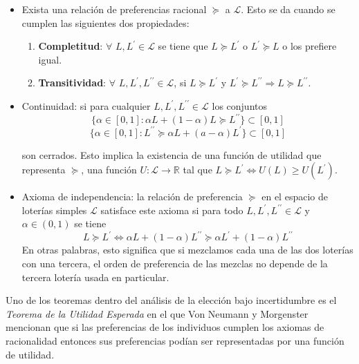 \begin{itemize}
    \item Exista una relación de preferencias racional $\succeq$ a $\mathscr{L}$. Esto se da cuando se cumplen las siguientes dos propiedades:
    \begin{enumerate}
        \item \textbf{Completitud}: $\forall$ $L,L^\prime \in \mathscr{L}$ se tiene que $L \succeq L^\prime$ o $L^\prime \succeq L$ o los prefiere igual.
        
        \item \textbf{Transitividad}: $\forall$ $L,L^\prime, L^{\prime \prime} \in \mathscr{L}$, si $L \succeq L^\prime $ y $L^\prime \succeq L^{\prime \prime} \Rightarrow L \succeq L^{\prime \prime}$.
    \end{enumerate}
    
    \item Continuidad: si para cualquier $L,L^\prime, L^{\prime \prime} \in \mathscr{L}$ los conjuntos
    $$\{ \alpha \in [0,1] : \alpha L + (1-\alpha)L \succeq L^{\prime \prime}\} \subset [0,1]$$
    $$\{ \alpha \in [0,1] : L^{\prime \prime} \succeq \alpha L + (a- \alpha) L^\prime \} \subset [0,1]$$
    
    son cerrados. Esto implica la existencia de una función de utilidad que representa $\succeq$, una función $U: \mathscr{L} \rightarrow \mathbb{R}$ tal que $L \succeq L^\prime \Leftrightarrow U(L) \geq U(L^\prime)$.
    
    \item Axioma de independencia: la relación de preferencia $\succeq$ en el espacio de loterías simples $\mathscr{L}$ satisface este axioma si para todo $L,L^\prime, L^{\prime \prime} \in \mathscr{L}$ y $\alpha \in (0,1)$ se tiene
    $$
    L \succeq L^\prime \Leftrightarrow \alpha L + (1-\alpha)L^{\prime \prime} \succeq \alpha L^{\prime} + (1-\alpha)L^{\prime \prime}
    $$
    En otras palabras, esto significa que si mezclamos cada una de las dos loterías con una tercera, el orden de preferencia de las mezclas no depende de la tercera lotería usada en particular.
\end{itemize}

Uno de los teoremas dentro del análisis de la elección bajo incertidumbre es el \textit{Teorema de la Utilidad Esperada} en el que Von Neumann y Morgenster mencionan que si las preferencias de los individuos cumplen los axiomas de racionalidad entonces sus preferencias podían ser representadas por una función de utilidad. \\

